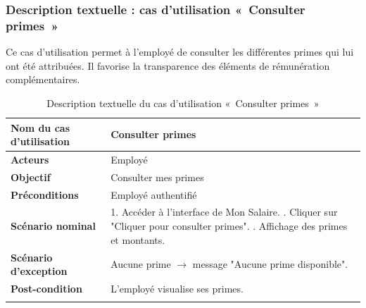 \subsubsection*{Description textuelle : cas d'utilisation «~Consulter primes~»}
Ce cas d'utilisation permet à l'employé de consulter les différentes primes qui lui ont été attribuées. Il favorise la transparence des éléments de rémunération complémentaires.
\begin{center}
\begin{longtable}{|p{5cm}|p{9cm}|}
\hline
\textbf{Nom du cas d'utilisation} & Consulter primes \\ \hline
\textbf{Acteurs} & Employé \\ \hline
\textbf{Objectif} & Consulter mes primes \\ \hline
\textbf{Préconditions} & Employé authentifié \\ \hline
\textbf{Scénario nominal} &
1. Accéder à l'interface de Mon Salaire. \newline
2. Cliquer sur "Cliquer pour consulter primes". \newline
3. Affichage des primes et montants. \\ \hline
\textbf{Scénario d'exception} & Aucune prime $\rightarrow$ message "Aucune prime disponible". \\ \hline
\textbf{Post-condition} & L'employé visualise ses primes. \\ \hline
\caption{Description textuelle du cas d'utilisation «~Consulter primes~»}
\end{longtable}
\end{center}

